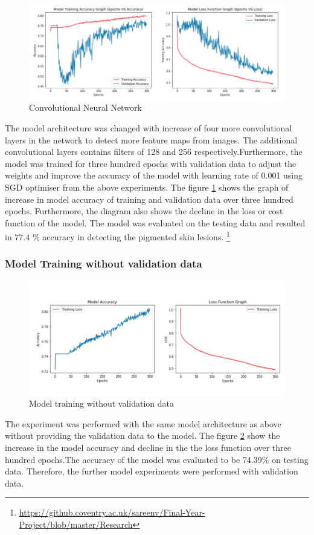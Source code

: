 
\begin{figure}[!htp]
    \centering
    \includegraphics[width=\textwidth]{Images/iConv.png}
    \caption{Convolutional Neural Network}
    \label{fig:cnn}
\end{figure}

The model architecture was changed with increase of four more convolutional layers in the network
to detect more feature maps from images. The additional convolutional layers contains filters of 128 and 256 
respectively.Furthermore, the model was trained for three hundred epochs with validation 
data to adjust the weights and improve the accuracy of the model with learning rate of 0.001 using SGD optimiser from the 
above experiments. The figure \ref{fig:cnn} shows the graph of increase in model accuracy of training and 
validation data over three hundred epochs. Furthermore, the diagram also shows the decline in the 
loss or cost function of the model. The model was evaluated on the testing data and resulted in 77.4 \% accuracy
in detecting the pigmented skin lesions. \footnote{\url{https://github.coventry.ac.uk/sareenv/Final-Year-Project/blob/master/Research}}
\pagebreak
\subsubsection{Model Training without validation data}
\begin{figure}[!htp]
    \centering
    \includegraphics[width=\textwidth]{Images/wvalid.png}
    \caption{Model training without validation data}
    \label{fig:cnnwvalid}
\end{figure}
The experiment was performed with the same model architecture as above without providing the validation 
data to the model. The figure \ref{fig:cnnwvalid} show the increase in the model accuracy and decline in the 
the loss function over three hundred epochs.The accuracy of the model was evaluated to be 74.39\% on testing data. 
Therefore, the further model experiments were performed with validation data. 